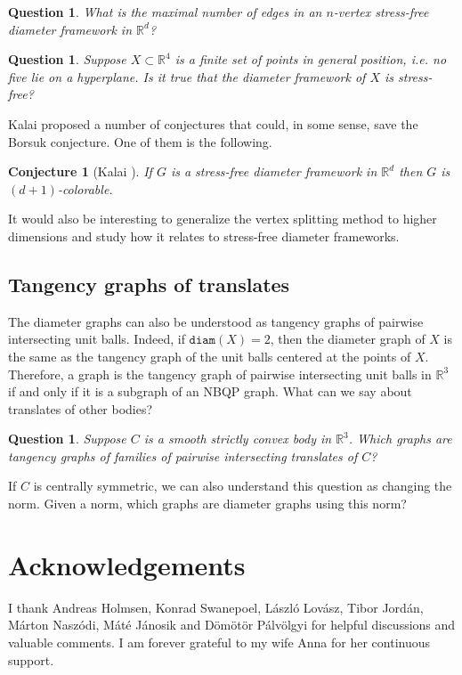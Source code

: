 \documentclass{article}
\newtheorem{conjecture}[theorem]{Conjecture}
\newtheorem{question}[theorem]{Question}
\newcommand{\R}[0]{\mathbb{R}}
\newcommand{\diam}[0]{\mathtt{diam}}
\begin{document}
\begin{question}
    What is the maximal number of edges in an $n$-vertex stress-free diameter framework in $\R^d$?
\end{question}
\begin{question}
    Suppose $X\subset \R^4$ is a finite set of points in general position, i.e. no five lie on a hyperplane. Is it true that the diameter framework of $X$ is stress-free?
\end{question}

Kalai proposed a number of conjectures that could, in some sense, save the Borsuk conjecture. One of them is the following. 
\begin{conjecture}[Kalai \cite{Kalai_2015}]
    If $G$ is a stress-free diameter framework in $\R^d$  then $G$ is $(d+1)$-colorable.
\end{conjecture}



It would also be interesting to generalize the vertex splitting method to higher dimensions and study how it relates to stress-free diameter frameworks.


\subsection{Tangency graphs of translates}
The diameter graphs can also be understood as tangency graphs of pairwise intersecting unit balls. Indeed, if $\diam (X)=2$, then the diameter graph of $X$ is the same as the tangency graph of the unit balls centered at the points of $X$. Therefore, a graph is the tangency graph of pairwise intersecting unit balls in $\R^3$ if and only if it is a subgraph of an NBQP graph. What can we say about translates of other bodies? 
\begin{question}
Suppose $C$ is a smooth strictly convex body in $\R^3$. Which graphs are tangency graphs of families of pairwise intersecting translates of $C$?
\end{question}

If $C$ is centrally symmetric, we can also understand this question as changing the norm. Given a norm, which graphs are diameter graphs using this norm?



\section*{Acknowledgements}
I thank Andreas Holmsen, Konrad Swanepoel, László Lovász, Tibor Jordán, Márton Naszódi, Máté Jánosik and Dömötör Pálvölgyi for helpful discussions and valuable comments. I am forever grateful to my wife Anna for her continuous support. 
\end{document}
